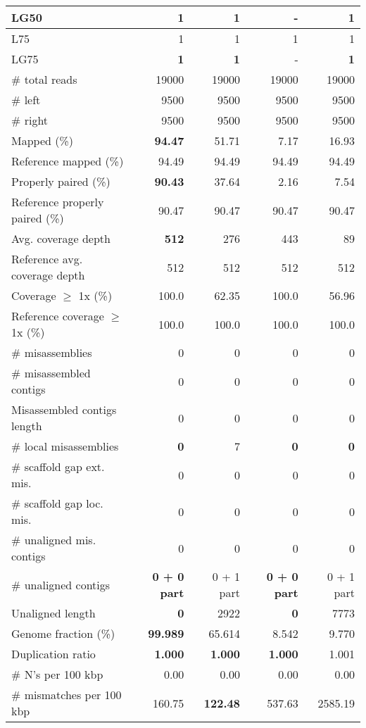 \documentclass[12pt,a4paper]{article}
\begin{document}
\begin{table}[ht]
\begin{center}
\begin{tabular}{|l*{4}{|r}|}
LG50 & {\bf 1} & {\bf 1} & - & {\bf 1} \\ \hline
L75 & 1 & 1 & 1 & 1 \\ \hline
LG75 & {\bf 1} & {\bf 1} & - & {\bf 1} \\ \hline
\# total reads & 19000 & 19000 & 19000 & 19000 \\ \hline
\# left & 9500 & 9500 & 9500 & 9500 \\ \hline
\# right & 9500 & 9500 & 9500 & 9500 \\ \hline
Mapped (\%) & {\bf 94.47} & 51.71 & 7.17 & 16.93 \\ \hline
Reference mapped (\%) & 94.49 & 94.49 & 94.49 & 94.49 \\ \hline
Properly paired (\%) & {\bf 90.43} & 37.64 & 2.16 & 7.54 \\ \hline
Reference properly paired (\%) & 90.47 & 90.47 & 90.47 & 90.47 \\ \hline
Avg. coverage depth & {\bf 512} & 276 & 443 & 89 \\ \hline
Reference avg. coverage depth & 512 & 512 & 512 & 512 \\ \hline
Coverage $\geq$ 1x (\%) & 100.0 & 62.35 & 100.0 & 56.96 \\ \hline
Reference coverage $\geq$ 1x (\%) & 100.0 & 100.0 & 100.0 & 100.0 \\ \hline
\# misassemblies & 0 & 0 & 0 & 0 \\ \hline
\# misassembled contigs & 0 & 0 & 0 & 0 \\ \hline
Misassembled contigs length & 0 & 0 & 0 & 0 \\ \hline
\# local misassemblies & {\bf 0} & 7 & {\bf 0} & {\bf 0} \\ \hline
\# scaffold gap ext. mis. & 0 & 0 & 0 & 0 \\ \hline
\# scaffold gap loc. mis. & 0 & 0 & 0 & 0 \\ \hline
\# unaligned mis. contigs & 0 & 0 & 0 & 0 \\ \hline
\# unaligned contigs & {\bf 0 + 0 part} & 0 + 1 part & {\bf 0 + 0 part} & 0 + 1 part \\ \hline
Unaligned length & {\bf 0} & 2922 & {\bf 0} & 7773 \\ \hline
Genome fraction (\%) & {\bf 99.989} & 65.614 & 8.542 & 9.770 \\ \hline
Duplication ratio & {\bf 1.000} & {\bf 1.000} & {\bf 1.000} & 1.001 \\ \hline
\# N's per 100 kbp & 0.00 & 0.00 & 0.00 & 0.00 \\ \hline
\# mismatches per 100 kbp & 160.75 & {\bf 122.48} & 537.63 & 2585.19 \\ \hline

\end{tabular}
\end{center}
\end{table}
\end{document}
